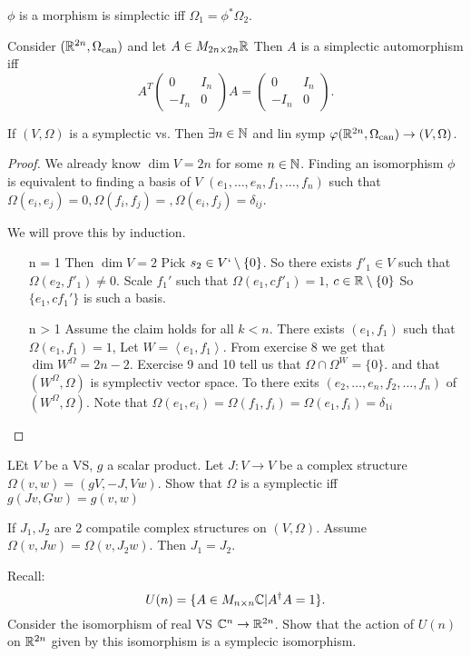 $\phi$ is a morphism is simplectic iff $\Omega_1 = \phi^*\Omega_2$.
\begin{example}
	Consider $(\mathbb{R}^{2n}, \Omega_\text{can} )$ and let $A \in M_{2n\times 2n}\mathbb{R}$
	Then $A$ is a simplectic automorphism iff \[
		A^{T} \begin{pmatrix} 0 & I_n \\ -I_n & 0 \end{pmatrix} A = \begin{pmatrix} 0 & I_n \\ -I_n & 0 \end{pmatrix} 
	.\] 
\end{example}
\begin{proposition}
	If $(V, \Omega)$ is a symplectic vs. Then $\exists n \in \mathbb{N}$ and lin symp $\varphi(\mathbb{R}^{2n}, \Omega_\text{can} ) \to (V, \Omega)$.
\end{proposition}
\begin{proof}
	We already know $\dim V = 2n$ for some $n \in \mathbb{N}$.
	Finding an isomorphism $\phi$ is equivalent to finding a basis of $V$ $(e_1, \ldots, e_n, f_1, \ldots, f_n)$ such that $\Omega(e_i, e_j) = 0, \Omega(f_i, f_j) = , \Omega(e_i, f_j) = \delta_{ij}$.

	We will prove this by induction.
	\begin{enumerate}
		\item [n = 1]
			Then $\dim V = 2$
			Pick  $s_2 \in V` \setminus \{0\} $. So there exists $f'_1 \in V$ such that $\Omega(e_2, f'_1) \ne 0$.
			Scale $f_1'$ such that $\Omega(e_1, cf'_1) = 1$, $c \in \mathbb{R} \setminus \{0\} $ 
			So $\{e_1, cf_1'\} $ is such  a basis.
		\item[n > 1]
			Assume the claim holds for all $k < n$.  
			There exists $(e_1, f_1)$ such that $\Omega(e_1, f_1)  = 1$, Let $W = \left<e_1, f_1\right>$. From exercise 8 we get that $\dim W^{\Omega} = 2n - 2$.
			Exercise 9 and 10 tell us that $\Omega \cap  \Omega^{W} = \{0\} $. and that $(W^{\Omega}, \Omega)$  is symplectiv vector space.
			To there exits $(e_2, \ldots, e_n, f_2, \ldots ,f_n)$ of $(W^{\Omega}, \Omega)$.
			Note that $\Omega(e_1, e_i) = \Omega(f_1, f_i) = \Omega(e_1, f_i) = \delta_{1i}$
	\end{enumerate}
\end{proof}
\begin{exercise}
	LEt $V$ be a VS, $g$ a scalar product. Let $J: V \to V$ be a complex structure $\Omega(v, w) = (gV, -J, Vw)$. 
	Show that $\Omega$ is a symplectic iff $g(J v, Gw) = g(v, w)$
\end{exercise}
\begin{exercise}
	If $J_1, J_2$ are 2 compatile complex structures on $(V, \Omega)$. Assume $\Omega(v, J w)  = \Omega(v, J_2 w)$. Then $J_1 = J_2$. 
\end{exercise}
\begin{exercise}
	Recall: \[
		U(n) = \{ A \in M_{n \times  n} \mathbb{C} | A^{\dagger}A = 1\} 
	.\] 
	Consider the isomorphism of real VS $\mathbb{C}^{n} \to \mathbb{R}^{2n}$. Show that the action of  $U(n)$ on $\mathbb{R}^{2n}$ given by this isomorphism is a symplecic isomorphism.
\end{exercise}
